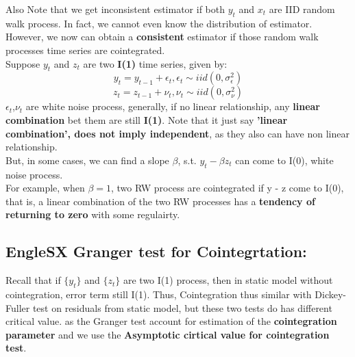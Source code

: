 \documentclass[12pt]{article}
\begin{document}
Also Note that we get inconsistent estimator if both $y_t$ and $x_t$ are IID random walk process. In fact, we cannot even know the distribution of estimator. However, we now can obtain a \textbf{consistent} estimator if those random walk processes time series are cointegrated.
\\

Suppose ${y_t}$ and ${z_t}$ are two \textbf{I(1)} time series, given by:
\begin{equation}
    y_t = y_{t-1} +\epsilon_t, \epsilon_t\sim iid (0, \sigma_\epsilon^2)
\end{equation}
\begin{equation}
    z_t = z_{t-1} +\nu_t, \nu_t\sim iid (0, \sigma_\nu^2)
\end{equation}
$\epsilon_t$,$\nu_t$ are white noise process, generally, if no linear relationship, any \textbf{linear combination} bet them are still \textbf{I(1)}. Note that it just say \textbf{'linear combination', does not imply independent}, as they also can have non linear relationship. 
\\

But, in some cases, we can find a slope $\beta$, s.t. $y_t - \beta z_t$ can come to I(0), white noise process. 
\\

For example, when $\beta = 1$, two RW process are cointegrated if y - z come to I(0), that is, a linear combination of the two RW processes has a \textbf{tendency of returning to zero} with some regulairty.
\\

{\color{RoyalBlue}
\subsection{EngleSX Granger test for Cointegrtation: }}

Recall that if $\{y_t\}$ and $\{z_t\}$ are two I(1) process, then in static model without cointegration, error term still I(1). Thus, Cointegration thus similar with Dickey-Fuller test on residuals from static model, but these two tests do has different critical value. as the Granger test account for estimation of the \textbf{cointegration parameter} and we use the \textbf{Asymptotic cirtical value for cointegration test}. 
\\
\end{document}
